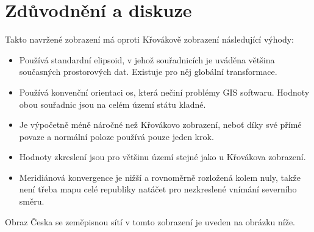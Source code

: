 \documentclass[a4paper]{article}
\begin{document}
\section{Zdůvodnění a diskuze}
Takto navržené zobrazení má oproti Křovákově zobrazení následující výhody:
\begin{itemize}
  \item Používá standardní elipsoid, v jehož souřadnicích je uváděna většina současných prostorových dat. Existuje pro něj globální transformace.
  \item Používá konvenční orientaci os, která nečiní problémy GIS softwaru. Hodnoty obou souřadnic jsou na celém území státu kladné.
  \item Je výpočetně méně náročné než Křovákovo zobrazení, neboť díky své přímé povaze a normální poloze používá pouze jeden krok.
  \item Hodnoty zkreslení jsou pro většinu území stejné jako u Křovákova zobrazení.
  \item Meridiánová konvergence je nižší a rovnoměrně rozložená kolem nuly, takže není třeba mapu celé republiky natáčet pro nezkreslené vnímání severního směru.
\end{itemize}
Obraz Česka se zeměpisnou sítí v tomto zobrazení je uveden na obrázku níže.

\end{document}
